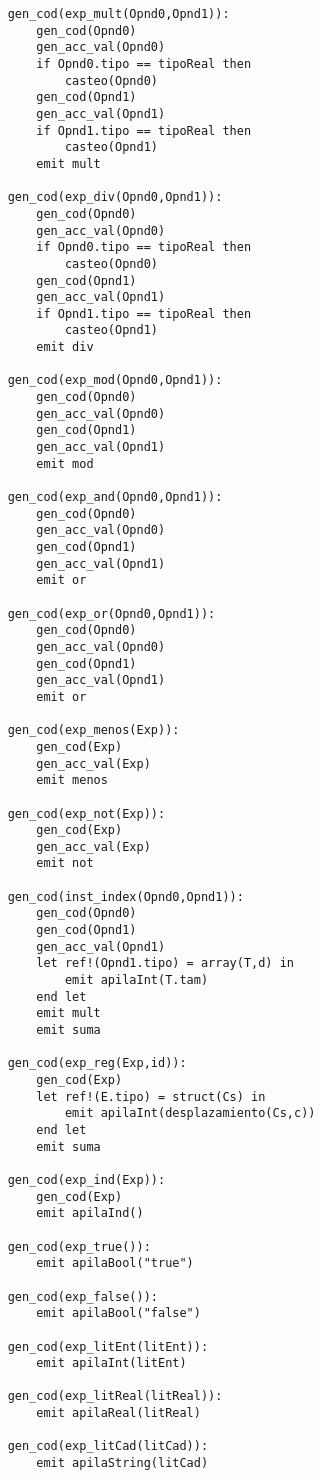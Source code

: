 \begin{lstlisting}
    gen_cod(exp_mult(Opnd0,Opnd1)):
        gen_cod(Opnd0)
        gen_acc_val(Opnd0)
        if Opnd0.tipo == tipoReal then
            casteo(Opnd0)
        gen_cod(Opnd1)
        gen_acc_val(Opnd1)
        if Opnd1.tipo == tipoReal then
            casteo(Opnd1)
        emit mult

    gen_cod(exp_div(Opnd0,Opnd1)):
        gen_cod(Opnd0)
        gen_acc_val(Opnd0)
        if Opnd0.tipo == tipoReal then
            casteo(Opnd0)
        gen_cod(Opnd1)
        gen_acc_val(Opnd1)
        if Opnd1.tipo == tipoReal then
            casteo(Opnd1)
        emit div

    gen_cod(exp_mod(Opnd0,Opnd1)):
        gen_cod(Opnd0)
        gen_acc_val(Opnd0)
        gen_cod(Opnd1)
        gen_acc_val(Opnd1)
        emit mod

    gen_cod(exp_and(Opnd0,Opnd1)):
        gen_cod(Opnd0)
        gen_acc_val(Opnd0)
        gen_cod(Opnd1)
        gen_acc_val(Opnd1)
        emit or

    gen_cod(exp_or(Opnd0,Opnd1)):
        gen_cod(Opnd0)
        gen_acc_val(Opnd0)
        gen_cod(Opnd1)
        gen_acc_val(Opnd1)
        emit or

    gen_cod(exp_menos(Exp)):
        gen_cod(Exp)
        gen_acc_val(Exp)
        emit menos

    gen_cod(exp_not(Exp)):
        gen_cod(Exp)
        gen_acc_val(Exp)
        emit not

    gen_cod(inst_index(Opnd0,Opnd1)):
        gen_cod(Opnd0)
        gen_cod(Opnd1)
        gen_acc_val(Opnd1)
        let ref!(Opnd1.tipo) = array(T,d) in
            emit apilaInt(T.tam)
        end let
        emit mult
        emit suma

    gen_cod(exp_reg(Exp,id)):
        gen_cod(Exp)
        let ref!(E.tipo) = struct(Cs) in
            emit apilaInt(desplazamiento(Cs,c))
        end let
        emit suma

    gen_cod(exp_ind(Exp)):
        gen_cod(Exp)
        emit apilaInd()

    gen_cod(exp_true()):
        emit apilaBool("true")

    gen_cod(exp_false()):
        emit apilaBool("false")

    gen_cod(exp_litEnt(litEnt)):
        emit apilaInt(litEnt)

    gen_cod(exp_litReal(litReal)):
        emit apilaReal(litReal)

    gen_cod(exp_litCad(litCad)):
        emit apilaString(litCad)


\end{lstlisting}
